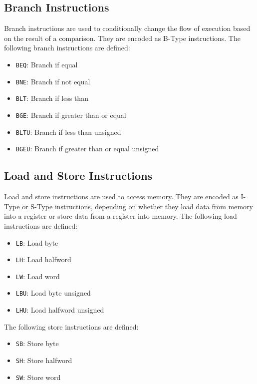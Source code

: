 \documentclass[sigconf]{acmart}
\begin{document}
\subsection{Branch Instructions}
Branch instructions are used to conditionally change the flow of execution based on the result of a comparison. They are encoded as B-Type instructions.
The following branch instructions are defined:
\begin{itemize}
    \item \texttt{BEQ}: Branch if equal
    \item \texttt{BNE}: Branch if not equal
    \item \texttt{BLT}: Branch if less than
    \item \texttt{BGE}: Branch if greater than or equal
    \item \texttt{BLTU}: Branch if less than unsigned
    \item \texttt{BGEU}: Branch if greater than or equal unsigned
\end{itemize}
\cite{riscv-spec}

\subsection{Load and Store Instructions}
Load and store instructions are used to access memory. They are encoded as I-Type or S-Type instructions, depending on whether they load data from memory into a register or store data from a register into memory.
The following load instructions are defined:
\begin{itemize}
    \item \texttt{LB}: Load byte
    \item \texttt{LH}: Load halfword
    \item \texttt{LW}: Load word
    \item \texttt{LBU}: Load byte unsigned
    \item \texttt{LHU}: Load halfword unsigned
\end{itemize}
The following store instructions are defined:
\begin{itemize}
    \item \texttt{SB}: Store byte
    \item \texttt{SH}: Store halfword
    \item \texttt{SW}: Store word
\end{itemize}
\cite{riscv-spec}
\end{document}
